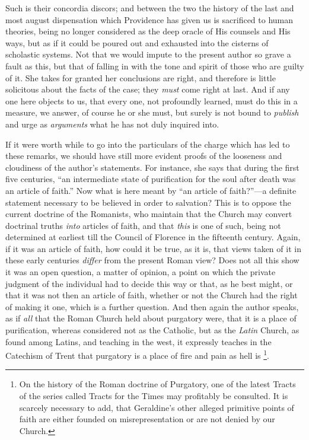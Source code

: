 Such is their concordia discors; and between the
two the history of the last and most august dispensation which
Providence has given us is sacrificed to human theories, being no longer
considered as the deep oracle of His counsels and His ways, but as if it
could be poured out and exhausted into the cisterns of scholastic
systems. Not that we would impute to the present author so grave a fault
as this, but that of falling in with the tone and spirit of those who are
guilty of it. She takes for granted her conclusions are right, and
therefore is little solicitous about the facts of the case; they \emph{must}
come right at last. And if any one here objects to us, that every one,
not profoundly learned, must do this in a measure, we answer, of course
he or she must, but surely is not bound to \emph{publish} and urge as \emph{arguments}
what he has not duly inquired into.

If it were worth while to go into the particulars
of the charge which has led to these remarks, we should have still more
evident proofs of the looseness and cloudiness of the author's
statements. For instance, she says that during the first five centuries,
``an intermediate state of purification for the soul after death was an
article of faith.'' Now what is here meant by ``an article of faith?''—a
definite statement necessary to be believed in order to salvation? This
is to oppose the current doctrine of the Romanists, who maintain that
the Church may convert doctrinal truths \emph{into} articles of faith,
and that \emph{this} is one of such, being not determined at earliest
till the Council of Florence in the fifteenth century. Again, if it was
an article of faith, how could it be true, as it is, that views taken of
it in these early centuries \emph{differ} from the present Roman view?
Does not all this show it was an open question, a matter of opinion, a
point on which the private judgment of the individual had to decide this
way or that, as he best might, or that it was not then an article of
faith, whether or not the Church had the right of making it one, which
is a further question. And then again the author speaks, as if \emph{all}
that the Roman Church held about purgatory were, that it is a place of
purification, whereas considered not as the Catholic, but as the \emph{Latin}
Church, as found among Latins, and teaching in the west, it expressly
teaches in the Catechism of Trent that purgatory is a place of fire and
pain as hell is \footnote{On the history of the Roman doctrine of Purgatory,
one of the latest Tracts of the series called Tracts for the Times may
profitably be consulted. It is scarcely necessary to add, that Geraldine's
other alleged primitive points of faith are either founded on
misrepresentation or are not denied by our Church.}.

